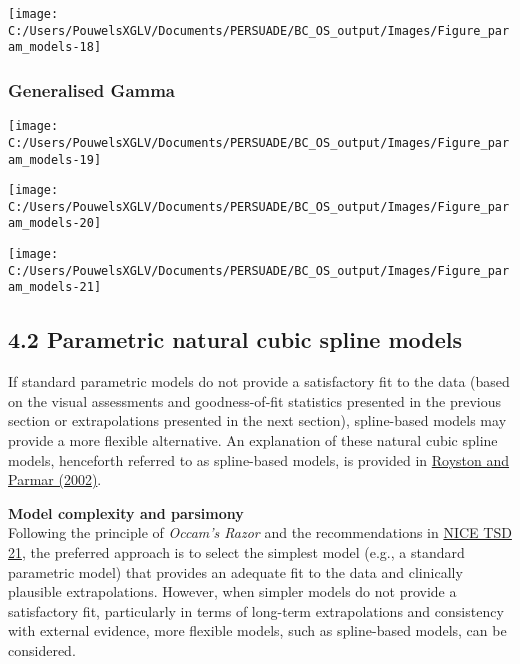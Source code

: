 \documentclass[
]{article}
\begin{document}
\begin{flushleft}\texttt{[image: C:/Users/PouwelsXGLV/Documents/PERSUADE/BC\_OS\_output/Images/Figure\_param\_models-18]} \end{flushleft}

\clearpage

\subsubsection{Generalised Gamma}\label{generalised-gamma}

\begin{flushleft}\texttt{[image: C:/Users/PouwelsXGLV/Documents/PERSUADE/BC\_OS\_output/Images/Figure\_param\_models-19]} \end{flushleft}

\begin{flushleft}\texttt{[image: C:/Users/PouwelsXGLV/Documents/PERSUADE/BC\_OS\_output/Images/Figure\_param\_models-20]} \end{flushleft}

\begin{flushleft}\texttt{[image: C:/Users/PouwelsXGLV/Documents/PERSUADE/BC\_OS\_output/Images/Figure\_param\_models-21]} \end{flushleft}

\clearpage

\subsection{4.2 Parametric natural cubic spline
models}\label{parametric-natural-cubic-spline-models}

If standard parametric models do not provide a satisfactory fit to the
data (based on the visual assessments and goodness-of-fit statistics
presented in the previous section or extrapolations presented in the
next section), spline-based models may provide a more flexible
alternative. An explanation of these natural cubic spline models,
henceforth referred to as spline-based models, is provided in
\href{https://doi.org/10.1002/sim.1203}{Royston and Parmar (2002)}.

\textbf{Model complexity and parsimony}\\
Following the principle of \emph{Occam's Razor} and the recommendations
in
\href{https://www.sheffield.ac.uk/media/34188/download?attachment}{NICE
TSD 21}, the preferred approach is to select the simplest model (e.g., a
standard parametric model) that provides an adequate fit to the data and
clinically plausible extrapolations. However, when simpler models do not
provide a satisfactory fit, particularly in terms of long-term
extrapolations and consistency with external evidence, more flexible
models, such as spline-based models, can be considered.
\end{document}
